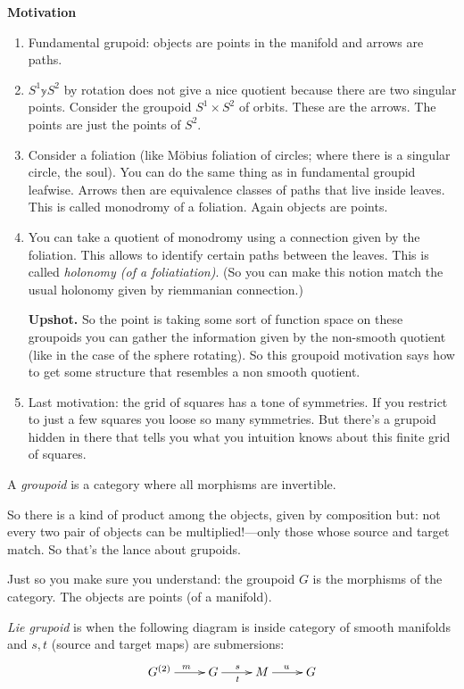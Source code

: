 \medskip\noindent
{\bf Motivation}
\begin{enumerate}
\item Fundamental grupoid: objects are points in the manifold and arrows are paths.
\item \(S^1 \mathbb{y} S^2\) by rotation does not give a nice quotient because there are two singular points. Consider the groupoid  \(S^1 \times S^2\) of orbits. These are the arrows. The points are just the points of \(S^2\).
\item Consider a foliation (like Möbius foliation of circles; where there is a singular circle, the soul). You can do the same thing as in fundamental groupid  leafwise. Arrows then are equivalence classes of paths that live inside leaves. This is called monodromy of a foliation. Again objects are points.
\item You can take a quotient of monodromy using a connection given by the foliation. This allows to identify certain paths between the leaves. This is called {\it holonomy (of a foliatiation)}. (So you can make this notion match the usual holonomy given by riemmanian connection.)

{\bf Upshot.}
	So the point is taking some sort of function space on these groupoids you can gather the information given by the non-smooth quotient (like in the case of the sphere rotating). So this groupoid motivation says how to get some structure that resembles a non smooth quotient.
\item Last motivation: the grid of squares has a tone of symmetries. If you restrict to just a few squares you loose so many symmetries. But there's a grupoid hidden in there that tells you what you intuition knows about this finite grid of squares.
\end{enumerate}

\begin{definition}
A {\it groupoid} is a category where all morphisms are invertible.
\end{definition}

So there is a kind of product among the objects, given by composition but:
 not every two pair of objects can be multiplied!---only those whose
source and target match. So that's the lance about grupoids.

Just so you make sure you understand: the groupoid \(G\) is the morphisms of the category. The objects are points (of a manifold).

\begin{definition}
{\it Lie grupoid} is when the following diagram is inside category of smooth manifolds and \(s,t\) (source and target maps) are submersions:
$$
\xymatrix{
G^{(2)}\ar[r]^m& G\ar[r]^ s_t & M\ar[r]^u&G
}
$$
\end{definition}

